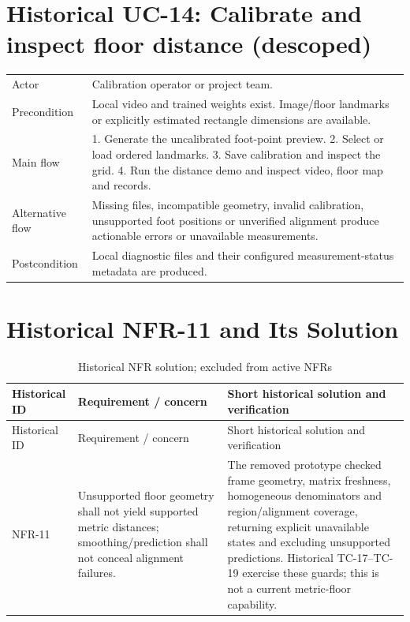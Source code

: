 \section{Historical UC-14: Calibrate and inspect floor distance (descoped)}
\begin{tabular}{P{0.22\textwidth}P{0.68\textwidth}}
\toprule
Actor & Calibration operator or project team.\\
Precondition & Local video and trained weights exist. Image/floor landmarks or explicitly estimated rectangle dimensions are available.\\
Main flow & 1. Generate the uncalibrated foot-point preview. 2. Select or load ordered landmarks. 3. Save calibration and inspect the grid. 4. Run the distance demo and inspect video, floor map and records.\\
Alternative flow & Missing files, incompatible geometry, invalid calibration, unsupported foot positions or unverified alignment produce actionable errors or unavailable measurements.\\
Postcondition & Local diagnostic files and their configured measurement-status metadata are produced.\\
\bottomrule
\end{tabular}

\section{Historical NFR-11 and Its Solution}
\begin{longtable}{P{0.16\textwidth}P{0.32\textwidth}P{0.42\textwidth}}
\caption{Historical NFR solution; excluded from active NFRs}\\
\toprule
Historical ID & Requirement / concern & Short historical solution and verification\\
\midrule
\endfirsthead
\toprule
Historical ID & Requirement / concern & Short historical solution and verification\\
\midrule
\endhead
NFR-11 & Unsupported floor geometry shall not yield supported metric distances; smoothing/prediction shall not conceal alignment failures. & The removed prototype checked frame geometry, matrix freshness, homogeneous denominators and region/alignment coverage, returning explicit unavailable states and excluding unsupported predictions. Historical TC-17--TC-19 exercise these guards; this is not a current metric-floor capability.\\
\bottomrule
\end{longtable}

